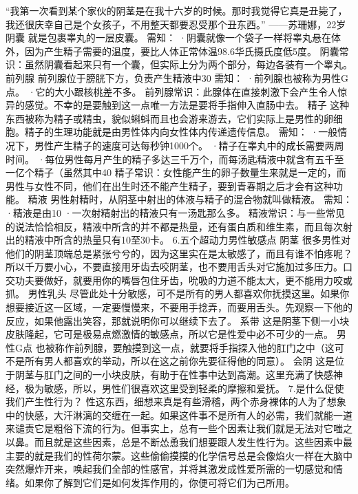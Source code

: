 \documentclass[12pt,UTF8]{ctexbook}
\begin{document}
“我第一次看到某个家伙的阴茎是在我十六岁的时候。那时我觉得它真是丑毙了，我还很庆幸自己是个女孩子，不用整天都要忍受那个丑东西。”
——苏珊娜，22岁
阴囊
就是包裹睾丸的一层皮囊。
需知：
·阴囊就像一个袋子一样将睾丸悬在体外，因为产生精子需要的温度，要比人体正常体温98.6华氏摄氏度低5度。
阴囊常识：虽然阴囊看起来只有一个囊，但实际上分为两个部分，每边各装有一个睾丸。
前列腺
前列腺位于膀胱下方，负责产生精液中30%
需知：
·前列腺也被称为男性G点。
·它的大小跟核桃差不多。
前列腺常识：此腺体在直接刺激下会产生令人惊异的感觉。不幸的是要触到这一点唯一方法是要将手指伸入直肠中去。
精子
这种东西被称为精子或精虫，貌似蝌蚪而且也会游来游去，它们实际上是男性的卵细胞。精子的生理功能就是由男性体内向女性体内传递遗传信息。
需知：
·一般情况下，男性产生精子的速度可达每秒钟1000个。
·精子在睾丸中的成长需要两周时间。
·每位男性每月产生的精子多达三千万个，而每汤匙精液中就含有五千至一亿个精子（虽然其中40%
精子常识：女性能产生的卵子数量生来就是一定的，而男性与女性不同，他们在出生时还不能产生精子，要到青春期之后才会有这种功能。
精液
男性射精时，从阴茎中射出的体液与精子的混合物就叫做精液。
需知：
·精液是由10%
·一次射精射出的精液只有一汤匙那么多。
精液常识：与一些常见的说法恰恰相反，精液中所含的并不都是热量，还有蛋白质和维生素，而且每次射出的精液中所含的热量只有10至30卡。
6.五个超动力男性敏感点
阴茎
很多男性对他们的阴茎顶端总是紧张兮兮的，因为这里实在是太敏感了，而且有谁不怕疼呢？所以千万要小心，不要直接用牙齿去咬阴茎，也不要用舌头对它施加过多压力。口交功夫要做好，就要用你的嘴唇包住牙齿，吮吸的力道不能太大，更不能用力咬或抓。
男性乳头
尽管此处十分敏感，可不是所有的男人都喜欢你抚摸这里。如果你想要接近这一区域，一定要慢慢来，不要用手捻弄，而要用舌头。先观察一下他的反应，如果他露出笑容，那就说明你可以继续下去了。
系带
这是阴茎下侧一小块皮肤隆起，它可是极易点燃激情的敏感点，所以它是性爱中必不可少的一点。
男性G点
也被称作前列腺，要触摸到这一点，就要将手指探入他的肛门之中（这可不是所有男人都喜欢的举动，所以在这之前你先要征得他的同意）。
会阴
这是位于阴茎与肛门之间的一小块皮肤，有助于在性事中达到高潮。这里充满了快感神经，极为敏感，所以，男性们很喜欢这里受到轻柔的摩擦和爱抚。
7.是什么促使我们产生性行为？
性这东西，细想来真是有些滑稽，两个赤身裸体的人为了想象中的快感，大汗淋漓的交缠在一起。如果这件事不是所有人的必需，我们就能一道来谴责它是粗俗下流的行为。但事实上，总有一些个因素让我们就是无法对它嗤之以鼻。而且就是这些因素，总是不断怂恿我们想要跟人发生性行为。这些因素中最主要的就是我们的性荷尔蒙。这些偷偷摸摸的化学信号总是会像焰火一样在大脑中突然爆炸开来，唤起我们全部的性感官，并将其激发成性爱所需的一切感觉和情绪。如果你了解到它们是如何发挥作用的，你便可将它们为己所用。
\end{document}
